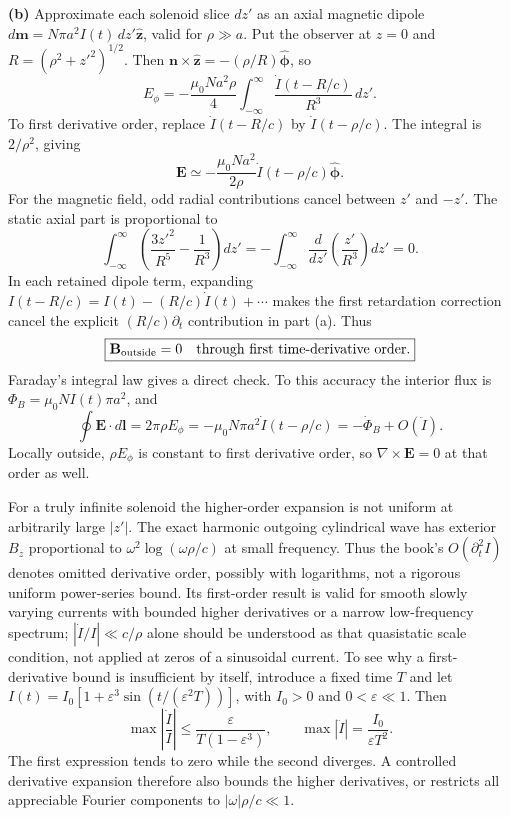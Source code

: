 \textbf{(b)} Approximate each solenoid slice $dz'$ as an axial magnetic
dipole $d\mathbf m=N\pi a^2 I(t)\,dz'\hat{\mathbf z}$, valid for
$\rho\gg a$. Put the observer at $z=0$ and
$R=(\rho^2+z'^2)^{1/2}$. Then
$\mathbf n\times\hat{\mathbf z}=-(\rho/R)\hat{\boldsymbol\phi}$, so
\[
E_\phi=-\frac{\mu_0Na^2\rho}{4}
\int_{-\infty}^{\infty}\frac{\dot I(t-R/c)}{R^3}\,dz'.
\]
To first derivative order, replace $\dot I(t-R/c)$ by
$\dot I(t-\rho/c)$. The integral is $2/\rho^2$, giving
\[
\boxed{\mathbf E\simeq-\frac{\mu_0Na^2}{2\rho}
\dot I(t-\rho/c)\hat{\boldsymbol\phi}.}
\]
For the magnetic field, odd radial contributions cancel between $z'$ and
$-z'$. The static axial part is proportional to
\[
\int_{-\infty}^{\infty}\left(\frac{3z'^2}{R^5}-\frac1{R^3}\right)dz'
=-\int_{-\infty}^{\infty}\frac d{dz'}\left(\frac{z'}{R^3}\right)dz'=0.
\]
In each retained dipole term, expanding $I(t-R/c)=I(t)-(R/c)\dot I(t)+\cdots$
makes the first retardation correction cancel the explicit
$(R/c)\partial_t$ contribution in part (a). Thus
\[
\boxed{\mathbf B_{\rm outside}=0\quad\hbox{through first time-derivative order}.}
\]
Faraday's integral law gives a direct check. To this accuracy the interior
flux is $\Phi_B=\mu_0NI(t)\pi a^2$, and
\[
\oint\mathbf E\cdot d\mathbf l
=2\pi\rho E_\phi=-\mu_0N\pi a^2\dot I(t-\rho/c)
=-\dot\Phi_B+O(\ddot I).
\]
Locally outside, $\rho E_\phi$ is constant to first derivative order,
so $\nabla\times\mathbf E=0$ at that order as well.

For a truly infinite solenoid the higher-order expansion is not uniform
at arbitrarily large $|z'|$. The exact harmonic outgoing cylindrical wave
has exterior $B_z$ proportional to $\omega^2\log(\omega\rho/c)$ at small
frequency. Thus the book's $O(\partial_t^2 I)$ denotes omitted derivative
order, possibly with logarithms, not a rigorous uniform power-series
bound. Its first-order result is valid for smooth slowly varying currents
with bounded higher derivatives or a narrow low-frequency spectrum;
$|\dot I/I|\ll c/\rho$ alone should be understood as that quasistatic
scale condition, not applied at zeros of a sinusoidal current.
To see why a first-derivative bound is insufficient by itself, introduce
a fixed time $T$ and let $I(t)=I_0[1+\varepsilon^3
\sin(t/(\varepsilon^2T))]$, with $I_0>0$ and $0<\varepsilon\ll1$. Then
\[
\max\left|\frac{\dot I}{I}\right|
\leq\frac{\varepsilon}{T(1-\varepsilon^3)},\qquad
\max|\ddot I|=\frac{I_0}{\varepsilon T^2}.
\]
The first expression tends to zero while the second diverges. A
controlled derivative expansion therefore also bounds the higher
derivatives, or restricts all appreciable Fourier components to
$|\omega|\rho/c\ll1$.

